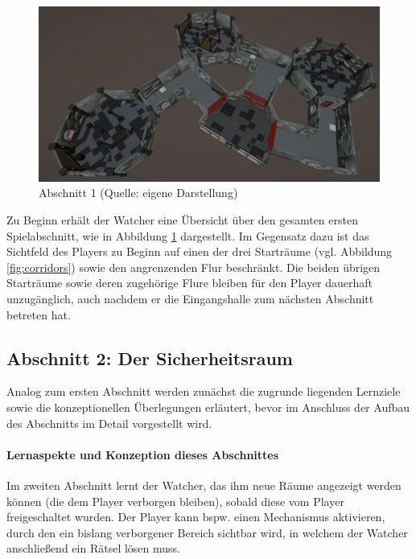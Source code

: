 \begin{figure}[ht]
\centering
\includegraphics[width=1\linewidth]{content/pictures/Abschnitt_00.PNG}
\caption{Abschnitt 1 (Quelle: eigene Darstellung)}
\label{fig:section_00}
\end{figure}

Zu Beginn erhält der Watcher eine Übersicht über den gesamten ersten Spielabschnitt, wie in Abbildung \ref{fig:section_00} dargestellt. Im Gegensatz dazu ist das Sichtfeld des Players zu Beginn auf einen der drei Starträume (vgl. Abbildung \ref{fig:corridors}) sowie den angrenzenden Flur beschränkt. Die beiden übrigen Starträume sowie deren zugehörige Flure bleiben für den Player dauerhaft unzugänglich, auch nachdem er die Eingangshalle zum nächsten Abschnitt betreten hat.

\subsection{Abschnitt 2: Der Sicherheitsraum}

Analog zum ersten Abschnitt werden zunächst die zugrunde liegenden Lernziele sowie die konzeptionellen Überlegungen erläutert, bevor im Anschluss der Aufbau des Abschnitts im Detail vorgestellt wird.

\paragraph{Lernaspekte und Konzeption dieses Abschnittes}

Im zweiten Abschnitt lernt der Watcher, das ihm neue Räume angezeigt werden können (die dem Player verborgen bleiben), sobald diese vom Player freigeschaltet wurden. Der Player kann bspw. einen Mechanismus aktivieren, durch den ein bislang verborgener Bereich sichtbar wird, in welchem der Watcher anschließend ein Rätsel lösen muss.


